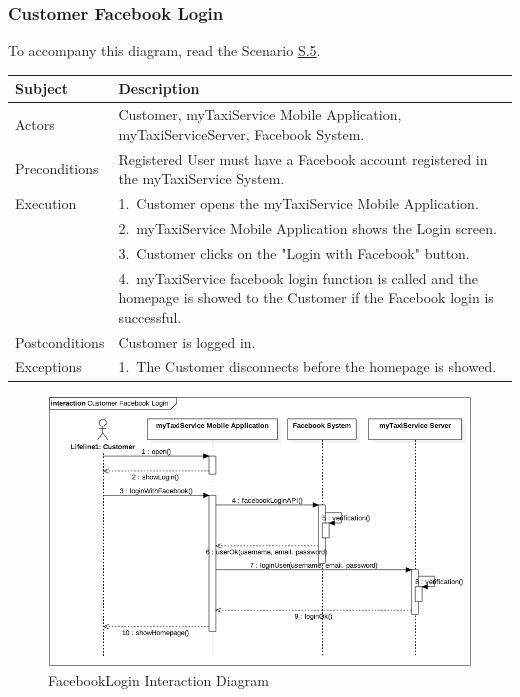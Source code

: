 \subsubsection{Customer Facebook Login}
			To accompany this diagram, read the Scenario \hyperref[sec:CustomerFacebookLoginScenario]{S.5}.

				\begin{table}[htpb]
					\centering
					\label{tab:CustomerFacebookLoginDiagramTable}
					\begin{tabularx}{\textwidth}{lp{9cm}}
						\hline
						\hline
							\textbf{Subject}
						& 
							\textbf{Description}\\
						\hline
							Actors	       &  Customer, myTaxiService Mobile Application, myTaxiServiceServer, Facebook System.\\
						\hline
							Preconditions  &  Registered User must have a Facebook account registered in the myTaxiService System.\\
						\hline
							Execution      &  1.~Customer opens the myTaxiService Mobile Application.\\
							               &  2.~myTaxiService Mobile Application shows the Login screen.\\
							               &  3.~Customer clicks on the "Login with Facebook" button.\\
							               &  4.~myTaxiService facebook login function is called and the homepage is showed to the Customer if the Facebook login is successful.\\
						\hline
							Postconditions &  Customer is logged in.\\
						\hline
							Exceptions     &  1.~The Customer disconnects before the homepage is showed.\\
									
						\hline
						\hline
					\end{tabularx}
				\end{table}
				
				\begin{figure}[H]
					\centering
					\includegraphics[width=\textwidth, scale=0.5]{IMG/InteractionDiagrams/CustomerFacebookLogin.png}
					\caption{FacebookLogin Interaction Diagram}\label{sec:FigureCustomerFacebookLogin}
				\end{figure}